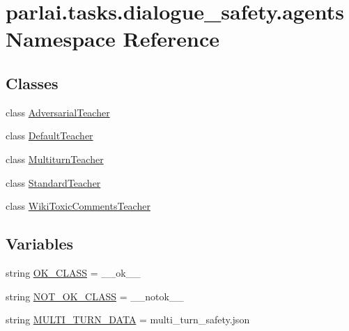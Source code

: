 \hypertarget{namespaceparlai_1_1tasks_1_1dialogue__safety_1_1agents}{}\section{parlai.\+tasks.\+dialogue\+\_\+safety.\+agents Namespace Reference}
\label{namespaceparlai_1_1tasks_1_1dialogue__safety_1_1agents}
\subsection*{Classes}
\begin{DoxyCompactItemize}
\item 
class \hyperlink{classparlai_1_1tasks_1_1dialogue__safety_1_1agents_1_1AdversarialTeacher}{Adversarial\+Teacher}
\item 
class \hyperlink{classparlai_1_1tasks_1_1dialogue__safety_1_1agents_1_1DefaultTeacher}{Default\+Teacher}
\item 
class \hyperlink{classparlai_1_1tasks_1_1dialogue__safety_1_1agents_1_1MultiturnTeacher}{Multiturn\+Teacher}
\item 
class \hyperlink{classparlai_1_1tasks_1_1dialogue__safety_1_1agents_1_1StandardTeacher}{Standard\+Teacher}
\item 
class \hyperlink{classparlai_1_1tasks_1_1dialogue__safety_1_1agents_1_1WikiToxicCommentsTeacher}{Wiki\+Toxic\+Comments\+Teacher}
\end{DoxyCompactItemize}
\subsection*{Variables}
\begin{DoxyCompactItemize}
\item 
string \hyperlink{namespaceparlai_1_1tasks_1_1dialogue__safety_1_1agents_a81255d91e36781d9afe9fd66882d26b0}{O\+K\+\_\+\+C\+L\+A\+SS} = \textquotesingle{}\+\_\+\+\_\+ok\+\_\+\+\_\+\textquotesingle{}
\item 
string \hyperlink{namespaceparlai_1_1tasks_1_1dialogue__safety_1_1agents_a48264e67e5e467abcf83e5cf4f7525f2}{N\+O\+T\+\_\+\+O\+K\+\_\+\+C\+L\+A\+SS} = \textquotesingle{}\+\_\+\+\_\+notok\+\_\+\+\_\+\textquotesingle{}
\item 
string \hyperlink{namespaceparlai_1_1tasks_1_1dialogue__safety_1_1agents_acbbed188c4b25c1651d7cb6a842ccfed}{M\+U\+L\+T\+I\+\_\+\+T\+U\+R\+N\+\_\+\+D\+A\+TA} = \textquotesingle{}multi\+\_\+turn\+\_\+safety.\+json\textquotesingle{}
\end{DoxyCompactItemize}


